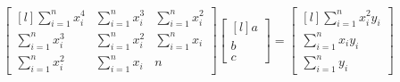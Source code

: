 \documentclass[21pt,a4paper,twoside]{article}
\begin{document}
	\[    %
	\begin{bmatrix*}[l]
		\sum_{i=1}^{n} x_i^4 & \sum_{i=1}^{n} x_i^3 & \sum_{i=1}^{n} x_i^2 \\
		\sum_{i=1}^{n} x_i^3 & \sum_{i=1}^{n} x_i^2 & \sum_{i=1}^{n} x_i \\
		\sum_{i=1}^{n} x_i^2 & \sum_{i=1}^{n} x_i & n
	\end{bmatrix*}
	\begin{bmatrix*}[l]
		a \\
		b \\
		c
	\end{bmatrix*}
	=
	\begin{bmatrix*}[l]
		\sum_{i=1}^{n} x_i^2 y_i \\
		\sum_{i=1}^{n} x_i y_i \\
		\sum_{i=1}^{n} y_i
	\end{bmatrix*}
	\] 
\end{document}
